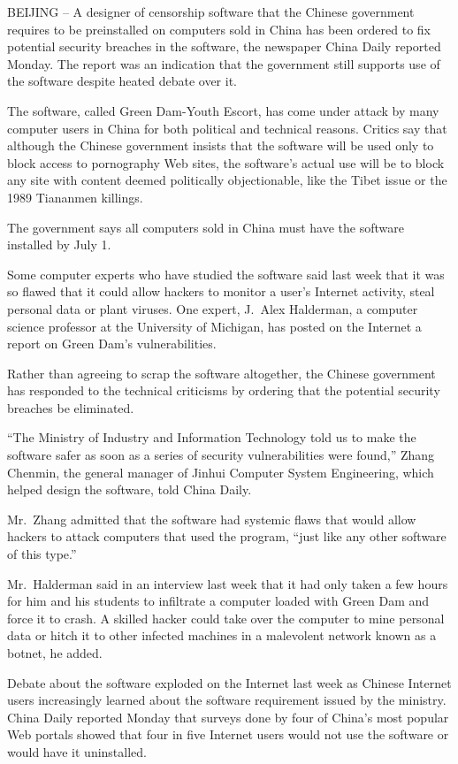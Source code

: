 ﻿\documentclass[12pt,a4paper,onecolumn]{article}
\begin{document}
BEIJING -- A designer of censorship software that the Chinese government requires to be preinstalled
on computers sold in China has been ordered to fix potential security breaches in the software, the
newspaper China Daily reported Monday. The report was an indication that the government still
supports use of the software despite heated debate over it.

The software, called Green Dam-Youth Escort, has come under attack by many computer users in China
for both political and technical reasons. Critics say that although the Chinese government insists
that the software will be used only to block access to pornography Web sites, the software's actual
use will be to block any site with content deemed politically objectionable, like the Tibet issue or
the 1989 Tiananmen killings.

The government says all computers sold in China must have the software installed by July 1.

Some computer experts who have studied the software said last week that it was so flawed that it
could allow hackers to monitor a user's Internet activity, steal personal data or plant viruses. One
expert, J.~Alex Halderman, a computer science professor at the University of Michigan, has posted on
the Internet a report on Green Dam's vulnerabilities.

Rather than agreeing to scrap the software altogether, the Chinese government has responded to the
technical criticisms by ordering that the potential security breaches be eliminated.

``The Ministry of Industry and Information Technology told us to make the software safer as soon as
a series of security vulnerabilities were found,'' Zhang Chenmin, the general manager of Jinhui
Computer System Engineering, which helped design the software, told China Daily.

Mr.~Zhang admitted that the software had systemic flaws that would allow hackers to attack computers
that used the program, ``just like any other software of this type.''

Mr.~Halderman said in an interview last week that it had only taken a few hours for him and his
students to infiltrate a computer loaded with Green Dam and force it to crash. A skilled hacker
could take over the computer to mine personal data or hitch it to other infected machines in a
malevolent network known as a botnet, he added.

Debate about the software exploded on the Internet last week as Chinese Internet users increasingly
learned about the software requirement issued by the ministry. China Daily reported Monday that
surveys done by four of China's most popular Web portals showed that four in five Internet users
would not use the software or would have it uninstalled.
\end{document}
